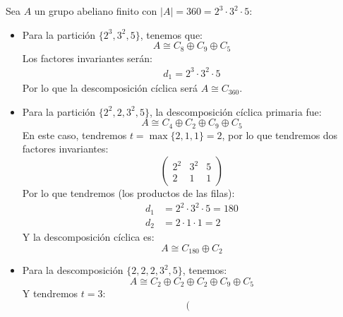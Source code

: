 \begin{ejemplo}
    Sea $A$ un grupo abeliano finito con $|A| = 360 = 2^3\cdot 3^2\cdot 5$:
    \begin{itemize}
        \item Para la partición $\{2^3, 3^2, 5\}$, tenemos que:
            \begin{equation*}
                A\cong C_8\oplus C_9\oplus C_5 
            \end{equation*}
            Los factores invariantes serán:
            \begin{align*}
                d_1 = 2^3\cdot 3^2\cdot 5
            \end{align*}
            Por lo que la descomposición cíclica será $A\cong C_{360}$.
        \item Para la partición $\{2^2, 2, 3^2, 5\}$, la descomposición cíclica primaria fue:
            \begin{equation*}
                A \cong C_4 \oplus C_2 \oplus C_9 \oplus C_5
            \end{equation*}
            En este caso, tendremos $t = \max\{2, 1, 1\} = 2$, por lo que tendremos dos factores invariantes:
            \begin{equation*}
                \left(\begin{array}{ccc}
                    2^2 & 3^2 & 5 \\
                     2 & 1 & 1
                \end{array}\right)
            \end{equation*}
            Por lo que tendremos (los productos de las filas):
            \begin{align*}
                d_1 &= 2^2 \cdot 3^2 \cdot 5 = 180 \\
                d_2 &= 2\cdot 1\cdot 1 = 2
            \end{align*}
            Y la descomposición cíclica es:
            \begin{equation*}
                A\cong C_{180}\oplus C_2
            \end{equation*}
        \item Para la descomposición $\{2,2,2,3^2,5\}$, tenemos:
            \begin{equation*}
                A\cong C_2 \oplus C_2 \oplus C_2 \oplus C_9 \oplus C_5
            \end{equation*}
            Y tendremos $t=3$:
            \begin{equation*}
                \left(\begin{array}{cccc}

\end{array}
\end{equation*}
\end{itemize}
\end{ejemplo}
